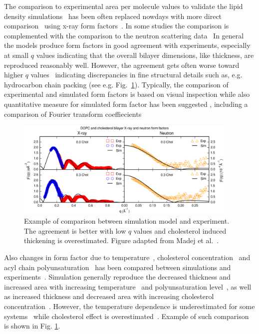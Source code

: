 \documentclass[aps,prl,superscriptaddress,twocolumn]{revtex4}
\begin{document}
The comparison to experimental area per molecule values to validate the lipid density simulations~\cite{tieleman97} has
been often replaced nowdays with more direct comparison~\cite{nagle00} using x-ray form 
factors~\cite{hogberg08,chiu09,klauda10,dickson12,jambeck12,lim12,klauda12,jambeck13,chowdhary13,lee14,maciejewski14,dickson14,tjornhammar14,madej15,kulig15b}.
In some studies the comparison is complemented with the comparison to the neutron scattering 
data~\cite{dickson12,jambeck12,lee14,dickson14,tjornhammar14,madej15}
In general the models produce form factors in good agreement with experiments, especially at small $q$ values indicating that the overall bilayer dimensions, like thickness, are reproduced reasonably well. However, the agreement gets often worse
toward higher $q$ 
values~\cite{chiu09,klauda10,klauda12,dickson12,lim12,jambeck12,chowdhary13,jambeck13,lee14,maciejewski14,dickson14,kulig15b,madej15}
indicating discrepancies in fine structural details such as, e.g. hydrocarbon chain packing (see e.g. Fig.~\ref{FFcomp}).
Typically, the comparison of experimental and simulated form factors is based on visual inspection while also quantitative measure
for simulated form factor has been suggested \cite{kucerka10}, including a comparison of Fourier transform coeffiecients \cite{benz05,??}
\begin{figure}[]
  \includegraphics[width=10.6cm]{../Fig/FFcompMADEJ.eps}
\newline
  \caption{\label{FFcomp}
    Example of comparison between simulation model and experiment.
    The agreement is better with low $q$ values and cholesterol induced thickening is overestimated.
    Figure adapted from Madej et al.~\cite{madej15}.
  } 
\end{figure}


Also changes in form factor due to temperature~\cite{jambeck12,zhuang14}, cholesterol concentration~\cite{jambeck13,madej15} 
and acyl chain polyunsaturation~\cite{eldho03,klauda12} 
has been compared between simulations and experiments~\cite{eldho03,kucerka05,pan08,hodzic08,kucerka08,pan09,khelasvili10,kucerka11}.
Simulation generally reproduce the decreased thickness and increased area with increasing temperature~\cite{jambeck12,zhuang14} and 
polyunsaturation level~\cite{eldho03,klauda12}, 
as well as increased thickness and decreased area with increasing cholesterol concentration~\cite{jambeck13,madej15}.
However, the temperature dependence is underestimated for some systems~\cite{jambeck12,zhuang14} while cholesterol
effect is overestimated~\cite{jambeck13,madej15}. Example of such comparison is shown in Fig. \ref{FFcomp}.
\end{document}
